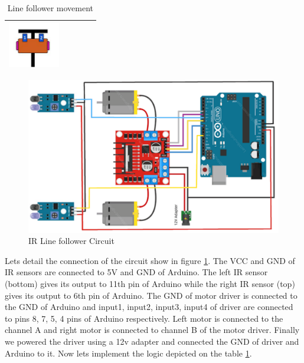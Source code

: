 \begin{table}
\begin{tabular}{|c|c|c|c|c|}
\begin{minipage}{.3\textwidth}
            \includegraphics[width=\linewidth, height=20mm]{Images/IR Sensor/IR_linefollower_stop.png}
            \vspace{1mm}
        \end{minipage}  \\ \hline
    \end{tabular}
    \vspace{9mm}
    \caption{Line follower movement}
    \label{tab:line_follower_move}
\end{table}
\renewcommand{\arraystretch}{1}

\begin{figure}
    \centering
    \includegraphics{Images/IR Sensor/ir_bot.png}
     \caption{\ac{IR} Line follower Circuit}
     \label{fig:ir_bot}
\end{figure}

\par Lets detail the connection of the circuit show in figure \ref{fig:ir_bot}. The VCC and GND of \ac{IR} sensors are connected to 5V and GND of Arduino. The left \ac{IR} sensor (bottom) gives its output to 11th pin of Arduino while the right \ac{IR} sensor (top) gives its output to 6th pin of Arduino. The GND of motor driver is connected to the GND of Arduino and input1, input2, input3, input4 of driver are connected to pins 8, 7, 5, 4 pins of Arduino respectively. Left motor is connected to the channel A and right motor is connected to channel B of the motor driver. Finally we powered the driver using a 12v adapter and connected the GND of driver and Arduino to it. Now lets implement the logic depicted on the table \ref{tab:line_follower_move}.

